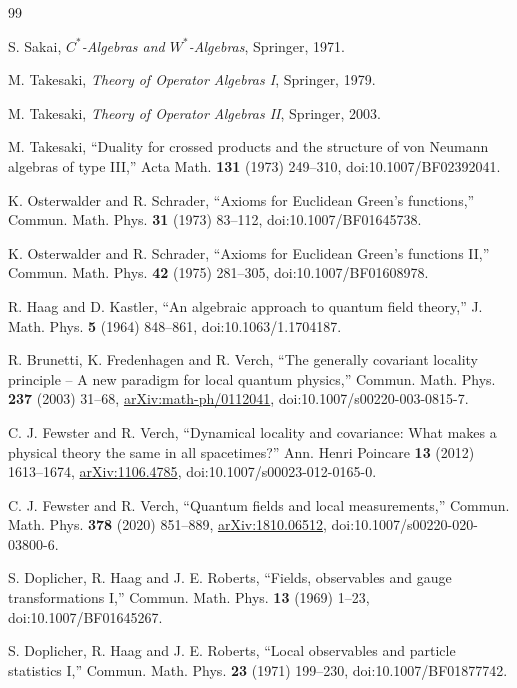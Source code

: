 \documentclass[12pt]{article}
\theoremstyle{definition}
\theoremstyle{remark}
\begin{document}
\begin{thebibliography}{99}
\raggedright

S. Sakai, \emph{\(C^*\)-Algebras and \(W^*\)-Algebras}, Springer, 1971.

M. Takesaki, \emph{Theory of Operator Algebras I}, Springer, 1979.

M. Takesaki, \emph{Theory of Operator Algebras II}, Springer, 2003.

M. Takesaki,
``Duality for crossed products and the structure of von Neumann algebras of
type III,'' Acta Math. \textbf{131} (1973) 249--310,
doi:10.1007/BF02392041.

K. Osterwalder and R. Schrader,
``Axioms for Euclidean Green's functions,''
Commun. Math. Phys. \textbf{31} (1973) 83--112,
doi:10.1007/BF01645738.

K. Osterwalder and R. Schrader,
``Axioms for Euclidean Green's functions II,''
Commun. Math. Phys. \textbf{42} (1975) 281--305,
doi:10.1007/BF01608978.

R. Haag and D. Kastler,
``An algebraic approach to quantum field theory,''
J. Math. Phys. \textbf{5} (1964) 848--861,
doi:10.1063/1.1704187.

R. Brunetti, K. Fredenhagen and R. Verch,
``The generally covariant locality principle -- A new paradigm for local
quantum physics,''
Commun. Math. Phys. \textbf{237} (2003) 31--68,
\href{https://arxiv.org/abs/math-ph/0112041}{arXiv:math-ph/0112041},
doi:10.1007/s00220-003-0815-7.

C. J. Fewster and R. Verch,
``Dynamical locality and covariance: What makes a physical theory the same in
all spacetimes?''
Ann. Henri Poincare \textbf{13} (2012) 1613--1674,
\href{https://arxiv.org/abs/1106.4785}{arXiv:1106.4785},
doi:10.1007/s00023-012-0165-0.

C. J. Fewster and R. Verch,
``Quantum fields and local measurements,''
Commun. Math. Phys. \textbf{378} (2020) 851--889,
\href{https://arxiv.org/abs/1810.06512}{arXiv:1810.06512},
doi:10.1007/s00220-020-03800-6.

S. Doplicher, R. Haag and J. E. Roberts,
``Fields, observables and gauge transformations I,''
Commun. Math. Phys. \textbf{13} (1969) 1--23,
doi:10.1007/BF01645267.

S. Doplicher, R. Haag and J. E. Roberts,
``Local observables and particle statistics I,''
Commun. Math. Phys. \textbf{23} (1971) 199--230,
doi:10.1007/BF01877742.


\end{thebibliography}
\end{document}
